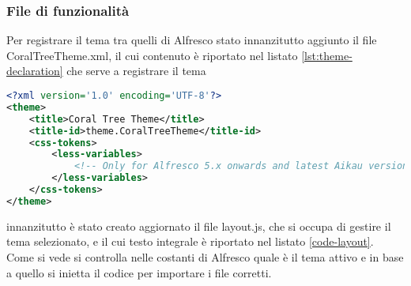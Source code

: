 \subsubsection{File di funzionalità}
Per registrare il tema tra quelli di Alfresco stato innanzitutto aggiunto il file CoralTreeTheme.xml, il cui contenuto è riportato nel listato \ref{lst:theme-declaration} che serve a registrare il tema
\begin{lstlisting}[language=XML, caption=XML della dichiarazione del tema, label=lst:theme-declaration]
<?xml version='1.0' encoding='UTF-8'?>
<theme>
    <title>Coral Tree Theme</title>
    <title-id>theme.CoralTreeTheme</title-id>
    <css-tokens>
        <less-variables>
            <!-- Only for Alfresco 5.x onwards and latest Aikau version -->
        </less-variables>
    </css-tokens>
</theme>
\end{lstlisting}
innanzitutto è stato creato aggiornato il file layout.js, che si occupa di gestire il tema selezionato, e il cui testo integrale è riportato nel listato \ref{code-layout}. Come si vede si controlla nelle costanti di Alfresco quale è il tema attivo e in base a quello si inietta il codice per importare i file corretti.
